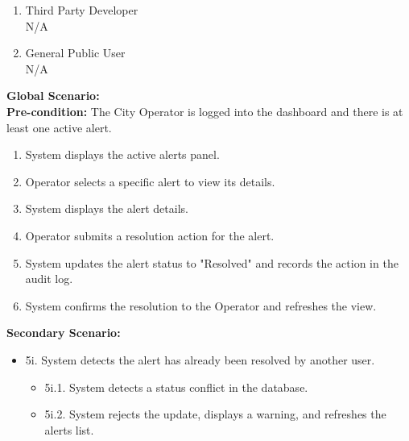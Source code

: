 {\begin{enumerate}[{\bf BE1.}]
\begin{enumerate}[{\bf VP1.}]
            {\bf Secondary Scenario:}
            \begin{itemize}
                \item[] {6i.} System detects the alert has already been resolved by another Operator.
                \begin{itemize}
                    \item[] {6i.1.} System detects a status conflict in the database.
                    \item[] {6i.2.} System prevents the state change, displays a warning that the alert was already resolved, and refreshes the active alerts list.
                \end{itemize}
            \end{itemize}
        \item {Third Party Developer} \\ N/A
        \item General Public User \\ N/A
    \end{enumerate}
    {\bf Global Scenario:} \\
    {\bf Pre-condition:} The City Operator is logged into the dashboard and there is at least one active alert.
        \begin{enumerate}[1. ]
            \item System displays the active alerts panel.
            \item Operator selects a specific alert to view its details.
            \item System displays the alert details.
            \item Operator submits a resolution action for the alert.
            \item System updates the alert status to "Resolved" and records the action in the audit log.
            \item System confirms the resolution to the Operator and refreshes the view.
        \end{enumerate}

    {\bf Secondary Scenario:}
        \begin{itemize}
            \item[] {5i.} System detects the alert has already been resolved by another user.
            \begin{itemize}
                \item[] {5i.1.} System detects a status conflict in the database.
                \item[] {5i.2.} System rejects the update, displays a warning, and refreshes the alerts list.
            \end{itemize}
        \end{itemize}


\end{enumerate}}
